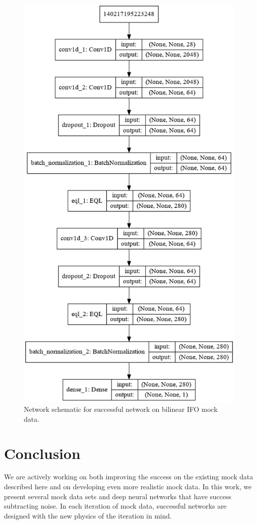 \begin{refsection}
\begin{figure}[htbp]
   \centering
   \includegraphics[width=0.7\columnwidth]{chapter_noise_sub/etc/bifo_net}
  \caption{Network schematic for successful network on bilinear IFO mock data.}
   \label{fig:bifo_net}
\end{figure}

\section{Conclusion}

We are actively working on both improving the success on the existing mock data described here and on developing even more realistic mock data. In this work, we present several mock data sets and deep neural networks that have success subtracting noise. In each iteration of mock data, successful networks are designed with the new physics of the iteration in mind.


\printbibliography[heading=subbibliography]
\end{refsection}